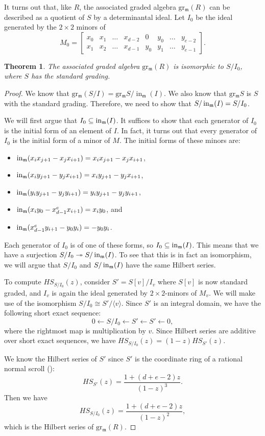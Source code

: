 \documentclass[12pt,reqno]{amsart}
\newtheorem{theorem}{Theorem}[section]
\theoremstyle{definition}
\theoremstyle{remark}
\newcommand{\grm}{\operatorname{gr_\frakm}}
\newcommand{\initial}{\operatorname{in}}
\newcommand{\grmR}{{\grm(R)}}
\newcommand{\frakm}{{\mathfrak{m}}}
\newcommand{\ideal}[1]{{\langle #1 \rangle}}
\begin{document}
It turns out that, like $R$, the associated graded algebra $\grmR$ can be described as a quotient of $S$ by a determinantal ideal.  Let $I_0$ be the ideal generated by the $2\times 2$ minors of 
$$
M_0 = \begin{bmatrix}
x_0 & x_1 & \ldots & x_{d-2} & 0 & y_0 & \ldots & y_{e-2}\\
x_1 & x_2 & \ldots & x_{d-1} & y_0 & y_1 & \ldots & y_{e-1}
\end{bmatrix}.
$$

\begin{theorem}
The associated graded algebra $\grmR$ is isomorphic to $S/I_0$, where $S$ has the standard grading.
\end{theorem} 
\begin{proof}
We know that $\grm (S/I) = \grm S/\initial_{\frakm}(I)$.  We also know that $\grm S$ is $S$ with the standard grading.  Therefore, we need to show that $S/\initial_{\frak m}(I) = S/I_0$.

We will first argue that $I_0 \subseteq \initial_{\frak m}(I)$. It suffices to show that each generator of $I_0$ is the initial form of an element of $I$.  In fact, it turns out that every generator of $I_0$ is the initial form of a minor of $M$.  The initial forms of these minors are:
\begin{itemize}
    \item $\initial_{\frak m}(x_ix_{j+1}-x_jx_{i+1}) = x_ix_{j+1}-x_jx_{i+1}$,
    \item $\initial_{\frak m}(x_iy_{j+1}-y_jx_{i+1}) = x_iy_{j+1}-y_jx_{i+1}$,
    \item $\initial_{\frak m}(y_iy_{j+1}-y_jy_{i+1}) = y_iy_{j+1}-y_jy_{i+1}$,
    \item $\initial_{\frak m}(x_iy_0-x_{d-1}^ex_{i+1}) = x_iy_0$, and
    \item $\initial_{\frak m}(x_{d-1}^ey_{i+1}-y_0y_i) = -y_0y_i$.
\end{itemize}
Each generator of $I_0$ is of one of these forms, so $I_0\subseteq \initial_{\frak m}(I)$.  This means that we have a surjection $S/I_0 \twoheadrightarrow S/\initial_{\frak m}(I)$.  To see that this is in fact an isomorphism, we will argue that $S/I_0$ and $S/\initial_{\frak m}(I)$ have the same Hilbert series.

To compute $HS_{S/I_0}(z)$, consider $S' = S[v]/I_v$ where $S[v]$ is now standard graded, and $I_v$ is again the ideal generated by $2 \times 2$-minors of $M_v$. We will make use of the isomorphism $S/I_0 \cong S'/\ideal{v}$. Since $S'$ is an integral domain, we have the following short exact sequence:
$$
0 \longleftarrow S/I_0 \longleftarrow S' \longleftarrow S' \longleftarrow 0,
$$
where the rightmost map is multiplication by $v$. Since Hilbert series are additive over short exact sequences, we have $HS_{S/I_0}(z) = (1-z)HS_{S'}(z)$.

We know the Hilbert series of $S'$ since $S'$ is the coordinate ring of a rational normal scroll (\cite[Proposition 3.6]{msTowardFreeResOScrolls}):
$$
HS_{S'}(z) = \frac{1+(d+e-2)z}{(1-z)^3}.
$$
Then we have
$$
HS_{S/I_0}(z) = \frac{1+(d+e-2)z}{(1-z)^2},
$$
which is the Hilbert series of $\grmR$.
\end{proof}
\end{document}

